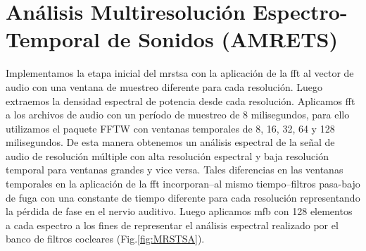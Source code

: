 







\section{Análisis Multiresolución Espectro-Temporal de Sonidos (AMRETS)}
\label{mrstsa}

Implementamos la etapa inicial del \gls{mrstsa} con la aplicación de la \gls{fft} al vector de audio con una ventana de muestreo diferente para cada resolución. Luego extraemos la densidad espectral de potencia desde cada resolución. Aplicamos \gls{fft} a los archivos de audio con un período de muestreo de 8 milisegundos, para ello utilizamos el paquete FFTW \cite{FFTW05, fftw} con ventanas temporales de 8, 16, 32, 64 y 128 milisegundos. De esta manera obtenemos un análisis espectral de la señal de audio de resolución múltiple con alta resolución espectral y baja resolución temporal para ventanas grandes y vice versa. Tales diferencias en las ventanas temporales en la aplicación de la \gls{fft} incorporan--al mismo tiempo--filtros pasa-bajo de fuga con una constante de tiempo diferente para cada resolución representando la pérdida de fase en el nervio auditivo. Luego aplicamos \gls{mfb} con 128 elementos a cada espectro a los fines de representar el análisis espectral realizado por el banco de filtros cocleares (Fig.\ref{fig:MRSTSA}).

